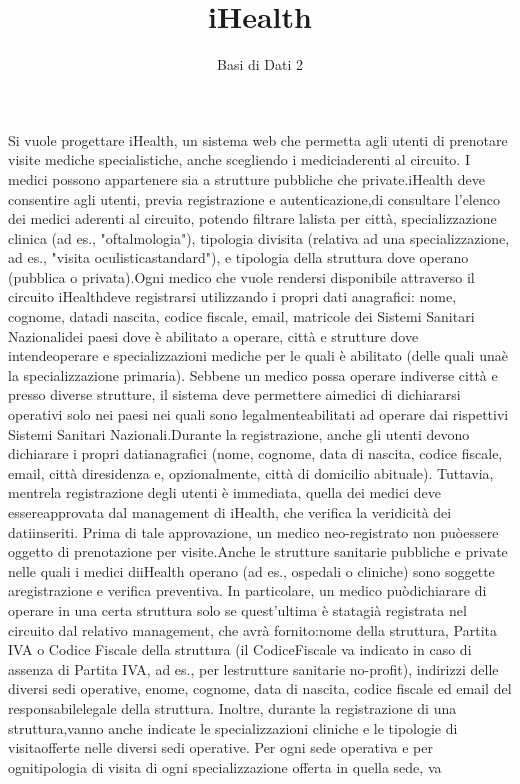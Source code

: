 \documentclass{homework}
\title{iHealth}
\author{Basi di Dati 2}
\date{}
\begin{document}
\maketitle
Si vuole progettare iHealth, un sistema web che permetta agli utenti di 
prenotare   visite   mediche   specialistiche,   anche   scegliendo   i   
mediciaderenti   al   circuito.   I   medici   possono   appartenere   sia  
 a   strutture pubbliche che private.iHealth deve consentire agli utenti, previa registrazione e autenticazione,di consultare l'elenco dei medici aderenti al circuito, potendo filtrare lalista per città, specializzazione clinica (ad es., "oftalmologia"), tipologia divisita   (relativa   ad   una   specializzazione,   ad   es.,   "visita   oculisticastandard"), e tipologia della struttura dove operano (pubblica o privata).Ogni medico che vuole rendersi disponibile attraverso il circuito iHealthdeve registrarsi utilizzando i propri dati anagrafici: nome, cognome, datadi nascita, codice fiscale, email, matricole dei Sistemi Sanitari Nazionalidei paesi dove è abilitato a operare, città e strutture dove intendeoperare e specializzazioni mediche per le quali è abilitato (delle quali unaè la specializzazione primaria). Sebbene un medico possa operare indiverse città e presso diverse strutture, il sistema deve permettere aimedici di dichiararsi operativi solo nei paesi nei quali sono legalmenteabilitati ad operare dai rispettivi Sistemi Sanitari Nazionali.Durante la registrazione, anche gli utenti devono dichiarare i propri datianagrafici (nome, cognome, data di nascita, codice fiscale, email, città diresidenza e, opzionalmente, città di domicilio abituale). Tuttavia, mentrela registrazione degli utenti è immediata, quella dei medici deve essereapprovata dal management di iHealth, che verifica la veridicità dei datiinseriti. Prima di tale approvazione, un medico neo-registrato non puòessere oggetto di prenotazione per visite.Anche le strutture sanitarie pubbliche e private nelle quali i medici diiHealth   operano   (ad   es.,   ospedali   o   cliniche)   sono   soggette   aregistrazione   e   verifica   preventiva.   In   particolare,   un   medico   puòdichiarare di operare in una certa struttura solo se quest'ultima è statagià registrata nel circuito dal relativo management, che avrà fornito:nome della struttura, Partita IVA o Codice Fiscale della struttura (il CodiceFiscale va indicato in caso di assenza di Partita IVA, ad es., per lestrutture sanitarie no-profit), indirizzi delle diversi sedi operative, enome, cognome, data di nascita, codice fiscale ed email del responsabilelegale della struttura. Inoltre, durante la registrazione di una struttura,vanno anche indicate le specializzazioni cliniche e le tipologie di visitaofferte nelle diversi sedi operative. Per ogni sede operativa e per ognitipologia di visita di ogni specializzazione offerta in quella sede, va
\end{document}
